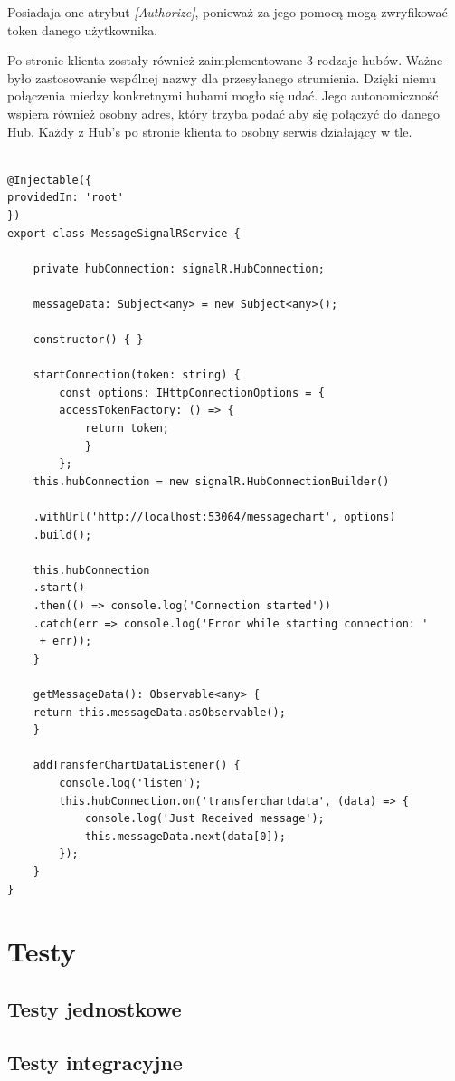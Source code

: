 \documentclass[12pt,a4paper]{article}
\begin{document}
\hspace*{0.7cm}Posiadaja one atrybut \textit{[Authorize]}, ponieważ za jego pomocą mogą zwryfikować token danego użytkownika.

\hspace*{0.7cm}Po stronie klienta zostały również zaimplementowane 3 rodzaje hubów. Ważne było zastosowanie wspólnej nazwy dla przesyłanego strumienia. Dzięki niemu połączenia miedzy konkretnymi hubami mogło się udać. Jego autonomiczność wspiera również osobny adres, który trzyba podać aby się połączyć do danego Hub. Każdy z Hub's po stronie klienta to osobny serwis działający w tle.

\begin{lstlisting}[caption={Implementacja SignalR po stronie klienta}]

@Injectable({
providedIn: 'root'
})
export class MessageSignalRService {

	private hubConnection: signalR.HubConnection;

	messageData: Subject<any> = new Subject<any>();

	constructor() { }

	startConnection(token: string) {
		const options: IHttpConnectionOptions = {
		accessTokenFactory: () => {
			return token;
			}
		};
	this.hubConnection = new signalR.HubConnectionBuilder()

	.withUrl('http://localhost:53064/messagechart', options)
	.build();

	this.hubConnection
	.start()
	.then(() => console.log('Connection started'))
	.catch(err => console.log('Error while starting connection: '
	 + err));
	}

	getMessageData(): Observable<any> {
	return this.messageData.asObservable();
	}

	addTransferChartDataListener() {
		console.log('listen');
		this.hubConnection.on('transferchartdata', (data) => {
			console.log('Just Received message');
			this.messageData.next(data[0]);
		});
	}
}
\end{lstlisting}


\section{Testy}

\subsection{Testy jednostkowe}   %
\subsection{Testy integracyjne}  %
\end{document}
